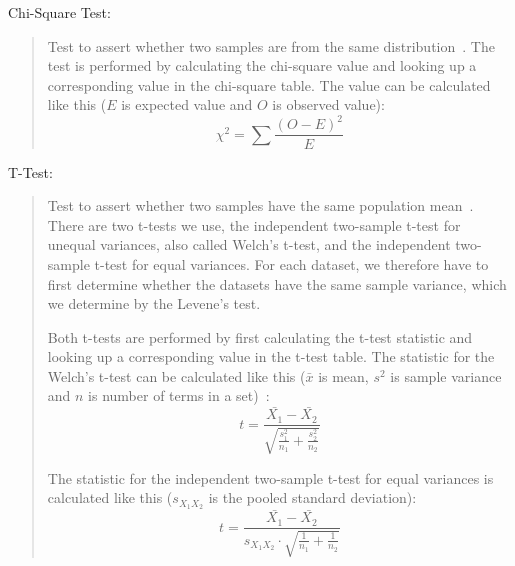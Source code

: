 \begin{framed}
  \hypertarget{metric:chi}{Chi-Square Test:}
  \begin{quote}
    Test to assert whether two samples are from the same distribution~\cite[Chapter~14]{press1996numerical}. The test is performed by calculating the chi-square value and looking up a corresponding value in the chi-square table. The value can be calculated like this ($E$ is expected value and $O$ is observed value):
    $$\chi^2 = \sum\frac{(O - E)^2}{E}$$
  \end{quote}

  \hypertarget{metric:tt}{T-Test:}
  \begin{quote}
    Test to assert whether two samples have the same population mean~\cite{Ruxton01072006}. There are two t-tests we use, the independent two-sample t-test for unequal variances, also called Welch's t-test, and the independent two-sample t-test for equal variances. For each dataset, we therefore have to first determine whether the datasets have the same sample variance, which we determine by the Levene's test. 

    Both t-tests are performed by first calculating the t-test statistic and looking up a corresponding value in the t-test table. The statistic for the Welch's t-test can be calculated like this ($\bar{x}$ is mean, $s^2$ is sample variance and $n$ is number of terms in a set)~\cite{Ruxton01072006}:
    $$t = \frac{\bar{X_1} - \bar{X_2}}{\sqrt{\frac{s_1^2}{n_1} + \frac{s_2^2}{n_2}}}$$

    The statistic for the independent two-sample t-test for equal variances is calculated like this ($s_{X_1 X_2}$ is the pooled standard deviation):
    $$t = \frac{\bar{X_1} - \bar{X_2}}{s_{X_1 X_2} \cdot \sqrt{\frac{1}{n_1} + \frac{1}{n_2}}}$$ 
  \end{quote}
\end{framed}

